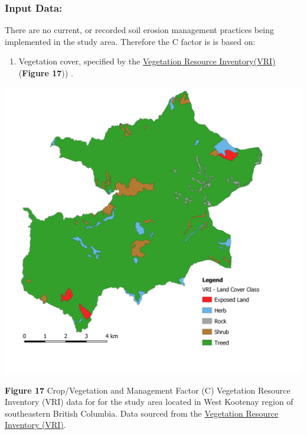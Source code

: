 \documentclass[
]{article}
\providecommand{\tightlist}{%
  \setlength{\itemsep}{0pt}\setlength{\parskip}{0pt}}
\begin{document}
\hypertarget{sec-input-data-c}{%
\subsubsection*{Input Data:}\label{sec-input-data-c}}

There are no current, or recorded soil erosion management practices being implemented in the study area. Therefore the C factor is is based on:

\begin{enumerate}
\def\labelenumi{\arabic{enumi}.}
\tightlist
\item
  Vegetation cover, specified by the \href{https://www2.gov.bc.ca/gov/content/industry/forestry/managing-our-forest-resources/forest-inventory}{Vegetation Resource Inventory(VRI)} (\textbf{Figure 17})) .
\end{enumerate}

\includegraphics{img/c_factor_input_vri.png}

\textbf{Figure 17} Crop/Vegetation and Management Factor (C) Vegetation Resource Inventory (VRI) data for for the study area located in West Kootenay region of southeastern British Columbia. Data sourced from the \href{https://www2.gov.bc.ca/gov/content/industry/forestry/managing-our-forest-resources/forest-inventory}{Vegetation Resource Inventory (VRI)}.
\end{document}
